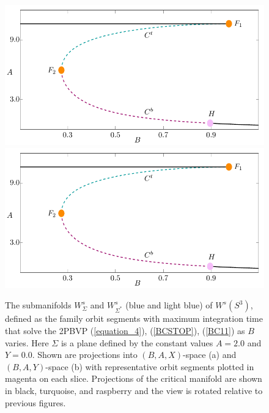\documentclass{ws-ijbc}
\begin{document}
\begin{figure}[ht]
\centering
\includegraphics[width=\textwidth, height=0.42\textheight, page=17]{figures.pdf}\\
\includegraphics[width=\textwidth, height=0.42\textheight, page=18]{figures.pdf}
\caption{The submanifolds $W^{s}_{\Sigma}$ and $W^{s}_{\Sigma^*}$ (blue and light blue) of $W^s(S^3)$, defined as the family orbit segments with maximum integration time that solve the 2PBVP (\ref{equation_4}), (\ref{BCSTOP}), (\ref{BC11}) as $B$ varies.  Here $\Sigma$ is a plane defined by the constant values $A=2.0$ and $Y=0.0$.  Shown are projections into $(B,A,X)$-space (a) and $(B,A,Y)$-space (b) with representative orbit segments plotted in magenta on each slice.  Projections of the critical manifold are shown in black, turquoise, and raspberry and the view is rotated relative to previous figures.}
\label{two_pieces}
\end{figure}
\end{document}

